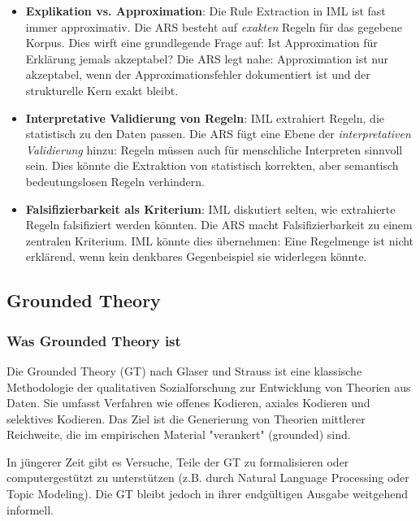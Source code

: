 \documentclass[12pt,a4paper]{article}
\begin{document}
\begin{itemize}
    \item \textbf{Explikation vs. Approximation}: Die Rule Extraction in IML 
    ist fast immer approximativ. Die ARS besteht auf \textit{exakten} Regeln 
    für das gegebene Korpus. Dies wirft eine grundlegende Frage auf: Ist 
    Approximation für Erklärung jemals akzeptabel? Die ARS legt nahe: 
    Approximation ist nur akzeptabel, wenn der Approximationsfehler dokumentiert 
    ist und der strukturelle Kern exakt bleibt.
    
    \item \textbf{Interpretative Validierung von Regeln}: IML extrahiert Regeln, 
    die statistisch zu den Daten passen. Die ARS fügt eine Ebene der 
    \textit{interpretativen Validierung} hinzu: Regeln müssen auch für 
    menschliche Interpreten sinnvoll sein. Dies könnte die Extraktion von 
    statistisch korrekten, aber semantisch bedeutungslosen Regeln verhindern.
    
    \item \textbf{Falsifizierbarkeit als Kriterium}: IML diskutiert selten, 
    wie extrahierte Regeln falsifiziert werden könnten. Die ARS macht 
    Falsifizierbarkeit zu einem zentralen Kriterium. IML könnte dies übernehmen: 
    Eine Regelmenge ist nicht erklärend, wenn kein denkbares Gegenbeispiel 
    sie widerlegen könnte.
\end{itemize}

\subsection{Grounded Theory}

\subsubsection{Was Grounded Theory ist}

Die Grounded Theory (GT) nach Glaser und Strauss ist eine klassische 
Methodologie der qualitativen Sozialforschung zur Entwicklung von Theorien 
aus Daten. Sie umfasst Verfahren wie offenes Kodieren, axiales Kodieren und 
selektives Kodieren. Das Ziel ist die Generierung von Theorien mittlerer 
Reichweite, die im empirischen Material "verankert" (grounded) sind.

In jüngerer Zeit gibt es Versuche, Teile der GT zu formalisieren oder 
computergestützt zu unterstützen (z.B. durch Natural Language Processing 
oder Topic Modeling). Die GT bleibt jedoch in ihrer endgültigen Ausgabe 
weitgehend informell.
\end{document}
